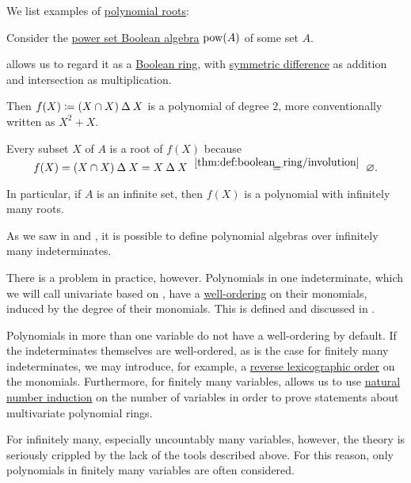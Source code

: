 \begin{example}\label{ex:def:root_of_polynomial}
  We list examples of \hyperref[def:root_of_polynomial]{polynomial roots}:
  \begin{thmenum}
     Consider the \hyperref[thm:boolean_algebra_of_subsets]{power set Boolean algebra} \( \operatorname{pow}(A) \) of some set \( A \).

     allows us to regard it as a \hyperref[def:boolean_ring]{Boolean ring}, with \hyperref[def:symmetric_difference]{symmetric difference} as addition and intersection as multiplication.

    Then \( f(X) \coloneqq (X \cap X) \mathbin \Delta X \) is a polynomial of degree \( 2 \), more conventionally written as \( X^2 + X \).

    Every subset \( X \) of \( A \) is a root of \( f(X) \) because
    \begin{equation*}
      f(X) = (X \cap X) \symdiff X = X \symdiff X
      \reloset {\ref{thm:def:boolean_ring/involution}} =
      \varnothing.
    \end{equation*}

    In particular, if \( A \) is an infinite set, then \( f(X) \) is a polynomial with infinitely many roots.
  \end{thmenum}
\end{example}

\begin{remark}\label{rem:polynomials_over_infinitely_many_indeterminates}
  As we saw in  and , it is possible to define polynomial algebras over infinitely many indeterminates.

  There is a problem in practice, however. Polynomials in one indeterminate, which we will call univariate based on , have a \hyperref[def:well_ordered_set]{well-ordering} on their monomials, induced by the degree of their monomials. This is defined and discussed in .

  Polynomials in more than one variable do not have a well-ordering by default. If the indeterminates themselves are well-ordered, as is the case for finitely many indeterminates, we may introduce, for example, a \hyperref[def:lexicographic_order]{reverse lexicographic order} on the monomials. Furthermore, for finitely many variables,  allows us to use \hyperref[con:induction/peano_arithmetic]{natural number induction} on the number of variables in order to prove statements about multivariate polynomial rings.

  For infinitely many, especially uncountably many variables, however, the theory is seriously crippled by the lack of the tools described above. For this reason, only polynomials in finitely many variables are often considered.
\end{remark}

